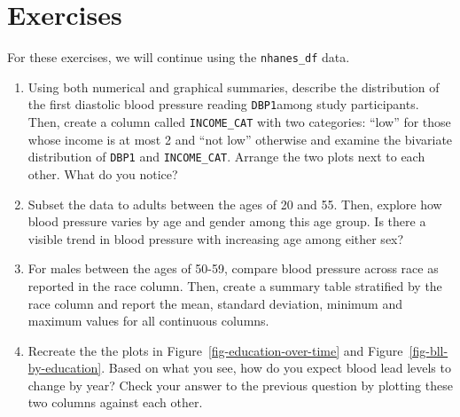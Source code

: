 \documentclass[
  letterpaper,
]{krantz}
\begin{document}
\section{Exercises}\label{exercises-2}

For these exercises, we will continue using the \texttt{nhanes\_df}
data.

\begin{enumerate}
\def\labelenumi{\arabic{enumi}.}
\item
  Using both numerical and graphical summaries, describe the
  distribution of the first diastolic blood pressure reading
  \texttt{DBP1}among study participants. Then, create a column called
  \texttt{INCOME\_CAT} with two categories: ``low'' for those whose
  income is at most 2 and ``not low'' otherwise and examine the
  bivariate distribution of \texttt{DBP1} and \texttt{INCOME\_CAT}.
  Arrange the two plots next to each other. What do you notice?
\item
  Subset the data to adults between the ages of 20 and 55. Then, explore
  how blood pressure varies by age and gender among this age group. Is
  there a visible trend in blood pressure with increasing age among
  either sex?
\item
  For males between the ages of 50-59, compare blood pressure across
  race as reported in the race column. Then, create a summary table
  stratified by the race column and report the mean, standard deviation,
  minimum and maximum values for all continuous columns.
\item
  Recreate the the plots in Figure~\ref{fig-education-over-time} and
  Figure~\ref{fig-bll-by-education}. Based on what you see, how do you
  expect blood lead levels to change by year? Check your answer to the
  previous question by plotting these two columns against each other.
\end{enumerate}
\end{document}
